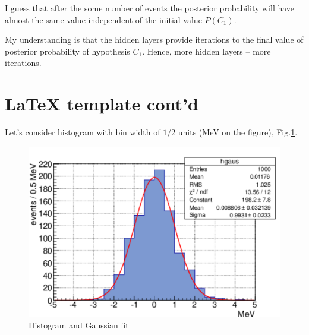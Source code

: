 \documentclass[english]{article}
\makeatletter
\def\ScaleIfNeeded{%
\ifdim\Gin@nat@width>\linewidth
\linewidth
\else
\Gin@nat@width
\fi
}
\makeatother
\begin{document}
I guess that after the some number of events the posterior probability will have almost the same value independent of the initial value $P(C_1)$.

My understanding is that the hidden layers provide iterations to the final value of posterior probability of hypothesis $C_1$.
Hence, more hidden layers -- more iterations.

\newpage

\section{LaTeX template cont'd}

Let's consider histogram with bin width of $1/2$ units (MeV on the figure), Fig.\ref{fig:hgaus}.

\begin{figure}[h]
\centering
\begin{minipage}[t]{1.0 \linewidth}
\includegraphics[width=\ScaleIfNeeded]{latex_template_pic}
\caption{Histogram and Gaussian fit}
\label{fig:hgaus}
\end{minipage}
\end{figure}
\end{document}

